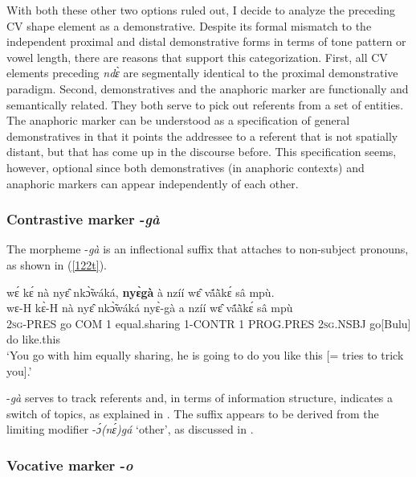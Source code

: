 With both these other two options ruled out, I decide to analyze the preceding CV shape element as a demonstrative. Despite its formal mismatch to the independent proximal and distal demonstrative forms in terms of tone pattern or vowel length, there are reasons that support this categorization. First, all CV elements preceding {\itshape ndɛ̀} are segmentally identical to the proximal demonstrative paradigm. Second,   demonstratives and the anaphoric marker are functionally and semantically related. They both serve to pick out referents from a set of entities. The anaphoric marker can be understood as a specification of general demonstratives in that it points the addressee to a referent that is not spatially distant, but that has come up in the discourse before. This specification seems, however, optional since both demonstratives (in anaphoric contexts) and anaphoric markers can appear independently of each other.



\subsubsection{Contrastive marker -{\itshape gà}}
\label{sec:CONTRS}

The morpheme -{\itshape gà} is an inflectional suffix that attaches to non-subject pronouns, as shown in (\ref{122t}).

\begin{exe} 
\ex\label{122t} 
  \glll wɛ́ kɛ́ nà nyɛ̂ nkɔ̃̀wáká, {\bfseries nyɛ̀gà} à nzíí wɛ̂ vã́ã̀kɛ́ sâ mpù. \\
         wɛ-H kɛ̀-H nà nyɛ̂ nkɔ̃̀wáká nyɛ̀-gà a nzíí wɛ̂ vã́ã̀kɛ́ sâ mpù \\
         2\textsc{sg}-PRES go COM 1 equal.sharing 1-CONTR 1 PROG.PRES 2\textsc{sg}.NSBJ go[Bulu] do like.this  \\
    \trans `You go with him equally sharing, he is going to do you like this [= tries to trick you].'
\end{exe}

\noindent -{\itshape gà} serves to track referents and, in terms of information structure, indicates a switch of topics, as explained in .
The suffix appears to be derived from the limiting modifier -{\itshape ɔ́(nɛ́)gá} `other', as discussed in . 

\subsubsection{Vocative marker -{\itshape o}}
\label{sec:VOCSuff}

